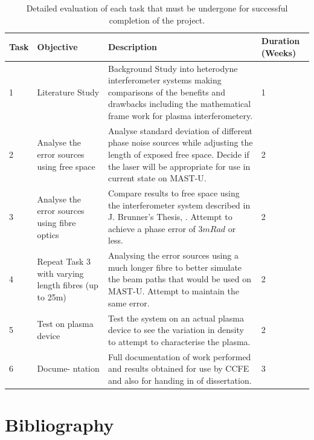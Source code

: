 \documentclass[12pt,a4paper,oneside]{report}
\begin{document}
\begin{center}
\begin{table}[H]
	\setlength\arrayrulewidth{1pt}
    \begin{tabular}{|p{1cm}|p{2.5cm}|p{9cm}|p{1.5cm}|}
    			\hline
    	        Task & Objective & Description & Duration (Weeks)\\
                \hline
                1 & Literature Study & Background Study into heterodyne interferometer systems making comparisons of the benefits and drawbacks including the mathematical frame work for plasma interferometery. & 1\\
                \hline
                2 & Analyse the error sources using free space& Analyse standard deviation of different phase noise sources while adjusting the length of exposed free space. Decide if the laser will be appropriate for use in current state on MAST-U.  & 2\\
                \hline
                3 & Analyse the error sources using fibre optics& Compare results to free space using the interferometer system described in J. Brunner's Thesis, \autocite{Brunner2017}. Attempt to achieve a phase error of 3$mRad$ or less.& 2\\
                \hline
                4 & Repeat Task 3 with varying length fibres (up to 25m)& Analysing the error sources using a much longer fibre to better simulate the beam paths that would be used on MAST-U. Attempt to maintain the same error. & 2\\
                \hline
                5 & Test on plasma device & Test the system on an actual plasma device to see the variation in density to attempt to characterise the plasma. & 2\\
                \hline
                6 & Docume- ntation & Full documentation of work performed and results obtained for use by CCFE and also for handing in of dissertation. & 3\\
        \hline
	\end{tabular}
    \caption{Detailed evaluation of each task that must be undergone for successful completion of the project.}
    \label{tbl:tasks}
\end{table}
\end{center}
\pagebreak
\chapter{Bibliography}
	\printbibliography[heading=none]

\pagebreak


\setcounter{page}{2}
\begin{appendices}

%
\end{appendices}
\end{document}
